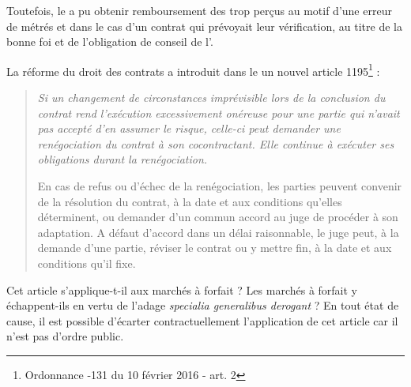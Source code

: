					Toutefois, le \Mo a pu obtenir remboursement des trop perçus au motif d'une erreur de métrés et dans le cas d'un contrat qui prévoyait leur vérification, au titre de la bonne foi et de l'obligation de conseil de l'\E.

					La réforme du droit des contrats a introduit dans le \cciv un nouvel article 1195\footnote{Ordonnance -131 du 10 février 2016 - art. 2} :
					\begin{quote}
						\itshape Si un changement de circonstances imprévisible lors de la conclusion du contrat rend l'exécution excessivement onéreuse pour une partie qui n'avait pas accepté d'en assumer le risque, celle-ci peut demander une renégociation du contrat à son cocontractant. Elle continue à exécuter ses obligations durant la renégociation.

						En cas de refus ou d'échec de la renégociation, les parties peuvent convenir de la résolution du contrat, à la date et aux conditions qu'elles déterminent, ou demander d'un commun accord au juge de procéder à son adaptation. A défaut d'accord dans un délai raisonnable, le juge peut, à la demande d'une partie, réviser le contrat ou y mettre fin, à la date et aux conditions qu'il fixe.
					\end{quote}
					Cet article s'applique-t-il aux marchés à forfait ? Les marchés à forfait y échappent-ils en vertu de l'adage \emph{specialia generalibus derogant} ? En tout état de cause, il est possible d'écarter contractuellement l'application de cet article car il n'est pas d'ordre public.

